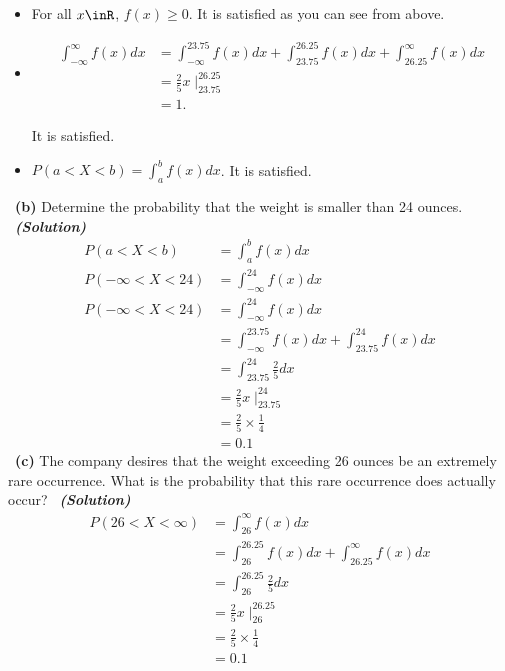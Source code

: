 \documentclass[a4 paper]{article}
\numberwithin{equation}{section}
\newcommand{\subproblem}[1]{~\newline\textbf{(#1)}}
\newcommand{\solution}{~\newline\textbf{\textit{(Solution)}} }
\newcommand{\0}{\mathbf{0}}
\begin{document}
\renewcommand\labelitemi{$\diamond$}

\begin{itemize}
\item For all $x\inR$, $f(x)\geq 0$. It is satisfied as you can see from above.
\item \begin{equation*}
    \begin{split}
        \int_{- \infty}^{\infty}f(x)dx &= \int_{- \infty}^{23.75}f(x)dx+\int_{23.75}^{26.25}f(x)dx+\int_{26.25}^{\infty}f(x)dx \\
        &= \frac{2}{5}x\mid_{23.75}^{26.25}\\
        &=1.
    \end{split}{}
\end{equation*}{}

It is satisfied.

\item $P(a<X<b)= \int_{a}^{b}f(x)dx$. It is satisfied.

\end{itemize}
\newline
\subproblem{b} Determine the probability that the weight is smaller than 24 ounces.\newline
\solution
\begin{equation*}
    \begin{split}
    P(a<X<b)& = \int_{a}^{b}f(x)dx \\
    P(- \infty <X<24)&= \int_{-\infty}^{24}f(x)dx \\
        P(- \infty <X<24) &= \int_{-\infty}^{24}f(x)dx \\
        &= \int_{-\infty}^{23.75}f(x)dx+ \int_{23.75}^{24}f(x)dx \\
        &= \int_{23.75}^{24} \frac{2}{5} dx \\
        &= \frac{2}{5}x\mid_{23.75}^{24} \\
        &= \frac{2}{5}\times\frac{1}{4} \\
        &= 0.1
    \end{split}{}
\end{equation*}{}
\newline
\subproblem{c} The company desires that the weight exceeding 26 ounces be an extremely rare occurrence. What is the probability that this rare occurrence does actually occur?\newline
\solution
\begin{equation*}
    \begin{split}
        P(26 <X< \infty) &= \int_{26}^{\infty}f(x)dx \\
        &= \int_{26}^{26.25}f(x)dx+ \int_{26.25}^{\infty}f(x)dx \\
        &= \int_{26}^{26.25} \frac{2}{5} dx \\
        &= \frac{2}{5}x\mid_{26}^{26.25} \\
        &= \frac{2}{5}\times\frac{1}{4} \\
        &= 0.1
    \end{split}{}
\end{equation*}{}


\newline
\end{document}
